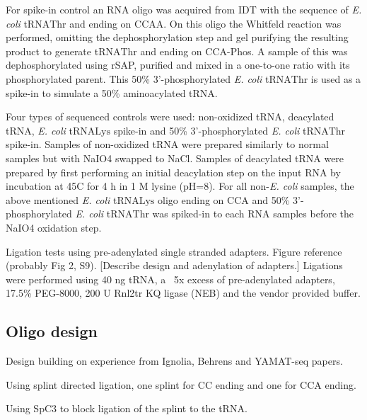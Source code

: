 \documentclass[9pt,lineno]{elife}
\begin{document}
For spike-in control an RNA oligo was acquired from IDT with the sequence of \textit{E. coli} tRNA$\text{Thr}$ and ending on CCAA.
On this oligo the Whitfeld reaction was performed, omitting the dephosphorylation step and gel purifying the resulting product to generate tRNA$\text{Thr}$ and ending on CCA-Phos.
A sample of this was dephosphorylated using rSAP, purified and mixed in a one-to-one ratio with its phosphorylated parent.
This 50\% 3'-phosphorylated \textit{E. coli} tRNA$\text{Thr}$ is used as a spike-in to simulate a 50\% aminoacylated tRNA.




Four types of sequenced controls were used: non-oxidized tRNA, deacylated tRNA, \textit{E. coli} tRNA$\text{Lys}$ spike-in and 50\% 3'-phosphorylated \textit{E. coli} tRNA$\text{Thr}$ spike-in.
Samples of non-oxidized tRNA were prepared similarly to normal samples but with NaIO4 swapped to NaCl.
Samples of deacylated tRNA were prepared by first performing an initial deacylation step on the input RNA by incubation at 45C for 4 h in 1 M lysine (pH=8).
For all non-\textit{E. coli} samples, the above mentioned \textit{E. coli} tRNA$\text{Lys}$ oligo ending on CCA and 50\% 3'-phosphorylated \textit{E. coli} tRNA$\text{Thr}$ was spiked-in to each RNA samples before the NaIO4 oxidation step.


Ligation tests using pre-adenylated single stranded adapters.
Figure reference (probably Fig 2, S9).
[Describe design and adenylation of adapters.]
Ligations were performed using 40 ng tRNA, a ~5x excess of pre-adenylated adapters, 17.5\% PEG-8000, 200 U Rnl2tr KQ ligase (NEB) and the vendor provided buffer.





\subsection*{Oligo design}
Design building on experience from Ignolia, Behrens and YAMAT-seq papers.

Using splint directed ligation, one splint for CC ending and one for CCA ending.

Using SpC3 to block ligation of the splint to the tRNA.
\end{document}
